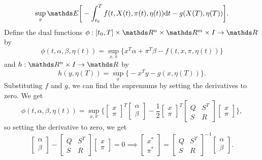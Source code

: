 \begin{equation*}
    \sup_\pi \E \bigg[ -\int_{t_0}^T f(t,X(t), \pi(t), \eta(t)) \d t - g(X(T), \eta(T)) \bigg].
\end{equation*}
Define the dual functions $\phi : [t_0, T] \times \R^n \times \R^m \times I \to \R$ by
\begin{equation}
    \phi(t, \alpha, \beta, \eta(t)) = \sup_{x, \pi} \big\{x^T \alpha + \pi^T \beta - f(t, x, \pi, \eta(t)) \big\} \label{eq: markov_phi_1}
\end{equation}
and $h: \R^n \times I \to \R$ by
\begin{equation}
    h(y, \eta(T)) = \sup_x \big\{-x^T y - g(x, \eta(T))\big\}. 
    \label{eq: markov_h_1}
\end{equation}
Substituting $f$ and $g$, we can find the supremums by setting the derivatives to zero. We get
\begin{equation*}
    \phi(t, \alpha, \beta, \eta(t)) = \sup_{x, \pi} \bigg\{
    \begin{bmatrix}
        x\\
        \pi
    \end{bmatrix}^T
    \begin{bmatrix}
        \alpha\\
        \beta
    \end{bmatrix} - \frac12
    \begin{bmatrix}
        x\\
        \pi
    \end{bmatrix}^T
    \begin{bmatrix}
        Q & S^T\\
        S & R
    \end{bmatrix}
    \begin{bmatrix}
        x\\
        \pi
    \end{bmatrix}
    \bigg\},
\end{equation*}
so setting the derivative to zero, we get
\begin{equation*}
    \begin{bmatrix}
        \alpha\\
        \beta
    \end{bmatrix} - 
    \begin{bmatrix}
        Q & S^T\\
        S & R
    \end{bmatrix}
    \begin{bmatrix}
        x\\
        \pi
    \end{bmatrix}
    = 0 \implies 
    \begin{bmatrix}
        x^\ast\\
        \pi^\ast
    \end{bmatrix} = 
    \begin{bmatrix}
        Q & S^T\\
        S & R
    \end{bmatrix}^{-1}
    \begin{bmatrix}
        \alpha\\
        \beta
    \end{bmatrix}.
\end{equation*}
